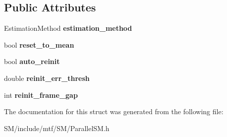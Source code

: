 \subsection*{Public Attributes}
\begin{DoxyCompactItemize}
\item 
\hypertarget{structParallelSMParams_a7c7e53ac1223d6f941c71450093c535d}{Estimation\-Method {\bfseries estimation\-\_\-method}}\label{structParallelSMParams_a7c7e53ac1223d6f941c71450093c535d}

\item 
\hypertarget{structParallelSMParams_a04752416a8ddcf902d5fffe1cf060bca}{bool {\bfseries reset\-\_\-to\-\_\-mean}}\label{structParallelSMParams_a04752416a8ddcf902d5fffe1cf060bca}

\item 
\hypertarget{structParallelSMParams_ac7dc01d73c6cd6391f0115f8c0b8ef5a}{bool {\bfseries auto\-\_\-reinit}}\label{structParallelSMParams_ac7dc01d73c6cd6391f0115f8c0b8ef5a}

\item 
\hypertarget{structParallelSMParams_a3474e5e9c187feeb7280d5035deb724f}{double {\bfseries reinit\-\_\-err\-\_\-thresh}}\label{structParallelSMParams_a3474e5e9c187feeb7280d5035deb724f}

\item 
\hypertarget{structParallelSMParams_a9d3262514a50e21dc308386a1f9e8cf4}{int {\bfseries reinit\-\_\-frame\-\_\-gap}}\label{structParallelSMParams_a9d3262514a50e21dc308386a1f9e8cf4}

\end{DoxyCompactItemize}


The documentation for this struct was generated from the following file\-:\begin{DoxyCompactItemize}
\item 
S\-M/include/mtf/\-S\-M/Parallel\-S\-M.\-h\end{DoxyCompactItemize}
